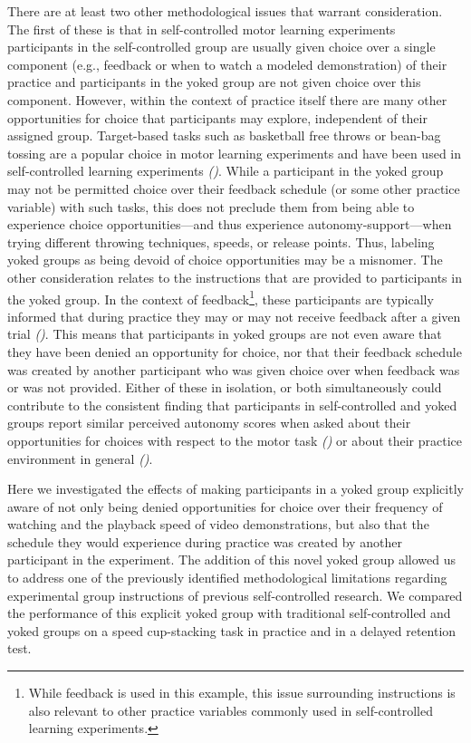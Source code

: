 \documentclass[
  english,
  jou]{apa7}
\begin{document}
There are at least two other methodological issues that warrant consideration. The first of these is that in self-controlled motor learning experiments participants in the self-controlled group are usually given choice over a single component (e.g., feedback or when to watch a modeled demonstration) of their practice and participants in the yoked group are not given choice over this component. However, within the context of practice itself there are many other opportunities for choice that participants may explore, independent of their assigned group. Target-based tasks such as basketball free throws or bean-bag tossing are a popular choice in motor learning experiments and have been used in self-controlled learning experiments \emph{()}. While a participant in the yoked group may not be permitted choice over their feedback schedule (or some other practice variable) with such tasks, this does not preclude them from being able to experience choice opportunities---and thus experience autonomy-support---when trying different throwing techniques, speeds, or release points. Thus, labeling yoked groups as being devoid of choice opportunities may be a misnomer. The other consideration relates to the instructions that are provided to participants in the yoked group. In the context of feedback\footnote{While feedback is used in this example, this issue surrounding instructions is also relevant to other practice variables commonly used in self-controlled learning experiments.}, these participants are typically informed that during practice they may or may not receive feedback after a given trial \emph{()}. This means that participants in yoked groups are not even aware that they have been denied an opportunity for choice, nor that their feedback schedule was created by another participant who was given choice over when feedback was or was not provided. Either of these in isolation, or both simultaneously could contribute to the consistent finding that participants in self-controlled and yoked groups report similar perceived autonomy scores when asked about their opportunities for choices with respect to the motor task \emph{()} or about their practice environment in general \emph{()}.

Here we investigated the effects of making participants in a yoked group explicitly aware of not only being denied opportunities for choice over their frequency of watching and the playback speed of video demonstrations, but also that the schedule they would experience during practice was created by another participant in the experiment. The addition of this novel yoked group allowed us to address one of the previously identified methodological limitations regarding experimental group instructions of previous self-controlled research. We compared the performance of this explicit yoked group with traditional self-controlled and yoked groups on a speed cup-stacking task in practice and in a delayed retention test.
\end{document}

